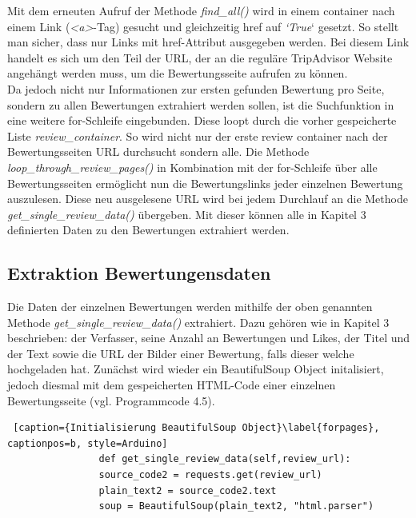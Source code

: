 \documentclass[a4paper,oneside,12pt]{report}
\begin{document}
				Mit dem erneuten Aufruf der Methode \textit{find\_all()} wird in einem container nach einem Link (\textit{<a>}-Tag) gesucht und gleichzeitig href auf \textit{‘True}‘ gesetzt. So stellt man sicher, dass nur Links mit href-Attribut ausgegeben werden. Bei diesem Link handelt es sich um den Teil der URL, der an die reguläre TripAdvisor Website angehängt werden muss, um die Bewertungsseite aufrufen zu können.
				\\
				Da jedoch nicht nur Informationen zur ersten gefunden Bewertung pro Seite, sondern zu allen Bewertungen extrahiert werden sollen, ist die Suchfunktion in eine weitere for-Schleife eingebunden. Diese loopt durch die vorher gespeicherte Liste \textit{review\_container}. So wird nicht nur der erste review container nach der Bewertungsseiten URL durchsucht sondern alle. Die Methode \textit{loop\_through\_review\_pages()} in Kombination mit der for-Schleife über alle Bewertungsseiten ermöglicht nun die Bewertungslinks jeder einzelnen Bewertung auszulesen.
				\newline
				Diese neu ausgelesene URL wird bei jedem Durchlauf an die Methode \textit{get\_single\_review\_data()} übergeben. Mit dieser können alle in Kapitel 3 definierten Daten zu den Bewertungen extrahiert werden.
	
	
	
			\subsection{Extraktion Bewertungensdaten}
			
				Die Daten der einzelnen Bewertungen werden mithilfe der oben genannten Methode 
				\textit{get\_single\_review\_data()} extrahiert. Dazu gehören wie in Kapitel 3 beschrieben: der Verfasser, seine Anzahl an Bewertungen und Likes, der Titel und der Text sowie die URL der Bilder einer Bewertung, falls dieser welche hochgeladen hat. 
				Zunächst wird wieder ein BeautifulSoup Object initalisiert, jedoch diesmal mit dem gespeicherten HTML-Code einer einzelnen Bewertungsseite (vgl. Programmcode 4.5).
				\\
				\begin{lstlisting} [caption={Initialisierung BeautifulSoup Object}\label{forpages}, captionpos=b, style=Arduino]
				def get_single_review_data(self,review_url):     
				source_code2 = requests.get(review_url)
				plain_text2 = source_code2.text
				soup = BeautifulSoup(plain_text2, "html.parser")
				\end{lstlisting}
				
\end{document}
